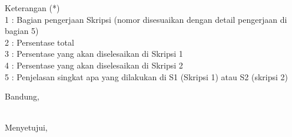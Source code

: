 \documentclass[a4paper,twoside]{article}
\begin{document}
Keterangan (*)\\
1 : Bagian pengerjaan Skripsi (nomor disesuaikan dengan detail pengerjaan di bagian 5)\\
2 : Persentase total \\
3 : Persentase yang akan diselesaikan di Skripsi 1 \\
4 : Persentase yang akan diselesaikan di Skripsi 2 \\
5 : Penjelasan singkat apa yang dilakukan di S1 (Skripsi 1) atau S2 (skripsi 2)

\vspace{1cm}
\centering Bandung, \tanggal\\
\vspace{2cm} \nama \\ 
\vspace{1cm}

Menyetujui, \\
\end{document}
